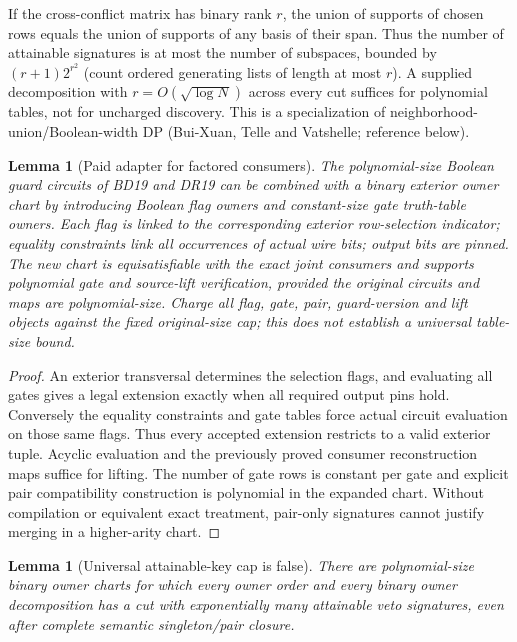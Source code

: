 \documentclass[11pt]{article}
\newtheorem{lemma}[theorem]{Lemma}
\begin{document}
If the cross-conflict matrix has binary rank $r$, the union of supports of chosen rows equals the union of supports of any basis of their span. Thus the number of attainable signatures is at most the number of subspaces, bounded by $(r+1)2^{r^2}$ (count ordered generating lists of length at most $r$). A supplied decomposition with $r=O(\sqrt{\log N})$ across every cut suffices for polynomial tables, not for uncharged discovery. This is a specialization of neighborhood-union/Boolean-width DP (Bui-Xuan, Telle and Vatshelle; reference below).
\begin{lemma}[Paid adapter for factored consumers]\label{lem:ds19-gate}
The polynomial-size Boolean guard circuits of BD19 and DR19 can be combined with a binary exterior owner chart by introducing Boolean flag owners and constant-size gate truth-table owners. Each flag is linked to the corresponding exterior row-selection indicator; equality constraints link all occurrences of actual wire bits; output bits are pinned. The new chart is equisatisfiable with the exact joint consumers and supports polynomial gate and source-lift verification, provided the original circuits and maps are polynomial-size. Charge all flag, gate, pair, guard-version and lift objects against the fixed original-size cap; this does not establish a universal table-size bound.
\end{lemma}
\begin{proof}
An exterior transversal determines the selection flags, and evaluating all gates gives a legal extension exactly when all required output pins hold. Conversely the equality constraints and gate tables force actual circuit evaluation on those same flags. Thus every accepted extension restricts to a valid exterior tuple. Acyclic evaluation and the previously proved consumer reconstruction maps suffice for lifting. The number of gate rows is constant per gate and explicit pair compatibility construction is polynomial in the expanded chart. Without compilation or equivalent exact treatment, pair-only signatures cannot justify merging in a higher-arity chart.
\end{proof}
\begin{lemma}[Universal attainable-key cap is false]\label{lem:ds19-expander}
There are polynomial-size binary owner charts for which every owner order and every binary owner decomposition has a cut with exponentially many attainable veto signatures, even after complete semantic singleton/pair closure.
\end{lemma}
\end{document}
